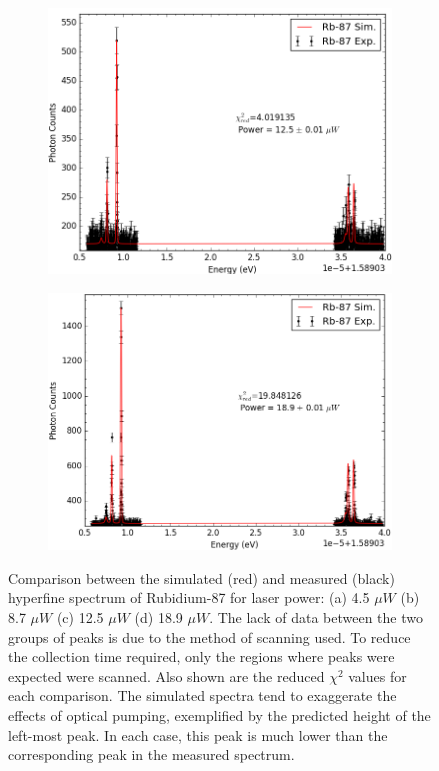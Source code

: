 \begin{figure}[h]
  	\begin{subfigure}[b]{0.49\textwidth}
        \includegraphics[width=\textwidth]{Graphics/119_120.png}
        \caption{}
    \end{subfigure}
    \begin{subfigure}[b]{0.49\textwidth}
        \includegraphics[width=\textwidth]{Graphics/096_097.png}
        \caption{}
        \label{}
    \end{subfigure}
    \caption[Comparison between the simulated and measured hyperfine spectra of Rubidium-87 for different laser powers.]{\small Comparison between the simulated (red) and measured (black) hyperfine spectrum of Rubidium-87 for laser power: (a) 4.5 $\mu W$ (b) 8.7 $\mu W$ (c) 12.5 $\mu W$ (d) 18.9 $\mu W$. The lack of data between the two groups of peaks is due to the method of scanning used. To reduce the collection time required, only the regions where peaks were expected were scanned. Also shown are the reduced $\chi^2$ values for each comparison. The simulated spectra tend to exaggerate the effects of optical pumping, exemplified by the predicted height of the left-most peak. In each case, this peak is much lower than the corresponding peak in the measured spectrum. }
    \label{power4-18}
\end{figure}
